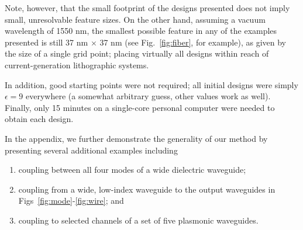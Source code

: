 Note, however, that the small footprint of the designs presented does not 
    imply small, unresolvable feature sizes.
On the other hand, assuming a vacuum wavelength of 1550 nm,
    the smallest possible feature in any of the examples presented is still
    37 nm $\times$ 37 nm (see Fig.~\ref{fig:fiber}, for example),
    as given by the size of a single grid point;
    placing virtually all designs within reach of current-generation lithographic
    systems.

In addition, good starting points were not required; 
    all initial designs were simply $\epsilon = 9$ everywhere
    (a somewhat arbitrary guess, other values work as well).
Finally, only 15 minutes on a single-core personal computer
    were needed to obtain each design.

In the appendix, we further demonstrate the generality of our method
    by presenting several additional examples including
    \begin{enumerate}
    \item coupling between all four modes of a wide dielectric waveguide;
    \item coupling from a wide, low-index waveguide to the output waveguides in 
        Figs~\ref{fig:mode}-\ref{fig:wire}; and
    \item coupling to selected channels of a set of five plasmonic waveguides.
    \end{enumerate}

